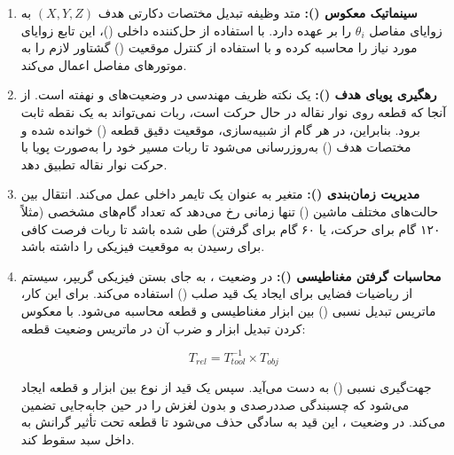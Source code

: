 \documentclass{article}
\begin{document}
\begin{enumerate}
	\item \textbf{سینماتیک معکوس ():} متد  وظیفه تبدیل مختصات دکارتی هدف $(X, Y, Z)$ به زوایای مفاصل $\theta_i$ را بر عهده دارد. با استفاده از حل‌کننده داخلی  ()، این تابع زوایای مورد نیاز را محاسبه کرده و با استفاده از کنترل موقعیت () گشتاور لازم را به موتورهای مفاصل اعمال می‌کند.
	
	\item \textbf{رهگیری پویای هدف ():} یک نکته ظریف مهندسی در وضعیت‌های  و  نهفته است. از آنجا که قطعه روی نوار نقاله در حال حرکت است، ربات نمی‌تواند به یک نقطه ثابت برود. بنابراین، در هر گام از شبیه‌سازی، موقعیت دقیق قطعه () خوانده شده و مختصات هدف () به‌روزرسانی می‌شود تا ربات مسیر خود را به‌صورت پویا با حرکت نوار نقاله تطبیق دهد.
	
	\item \textbf{مدیریت زمان‌بندی ():} متغیر  به عنوان یک تایمر داخلی عمل می‌کند. انتقال بین حالت‌های مختلف ماشین () تنها زمانی رخ می‌دهد که تعداد گام‌های مشخصی (مثلاً ۱۲۰ گام برای حرکت، یا ۶۰ گام برای گرفتن) طی شده باشد تا ربات فرصت کافی برای رسیدن به موقعیت فیزیکی را داشته باشد.
	
	\item \textbf{محاسبات گرفتن مغناطیسی ():} در وضعیت ، به جای بستن فیزیکی گریپر، سیستم از ریاضیات فضایی برای ایجاد یک قید صلب () استفاده می‌کند. برای این کار، ماتریس تبدیل نسبی () بین ابزار مغناطیسی و قطعه محاسبه می‌شود. با معکوس کردن تبدیل ابزار و ضرب آن در ماتریس وضعیت قطعه:
	
	$$T_{rel} = T_{tool}^{-1} \times T_{obj}$$
	
	جهت‌گیری نسبی () به دست می‌آید. سپس یک قید از نوع  بین ابزار و قطعه ایجاد می‌شود که چسبندگی صددرصدی و بدون لغزش را در حین جابه‌جایی تضمین می‌کند. در وضعیت ، این قید به سادگی حذف می‌شود تا قطعه تحت تأثیر گرانش به داخل سبد سقوط کند.
\end{enumerate}
\end{document}
